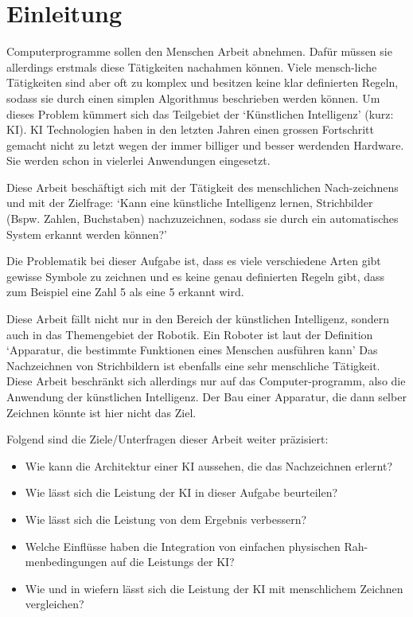 \chapter{Einleitung}
Computerprogramme sollen den Menschen Arbeit abnehmen. Dafür müssen sie
allerdings erstmals diese Tätigkeiten nachahmen können. Viele mensch\hyp{}liche
Tätigkeiten sind aber oft zu komplex und besitzen keine klar definierten Regeln,
sodass sie durch einen simplen Algorithmus beschrieben werden können. Um dieses
Problem kümmert sich das Teilgebiet der `Künstlichen Intelligenz' (kurz: KI). KI
Technologien haben in den letzten Jahren einen grossen Fortschritt gemacht nicht
zu letzt wegen der immer billiger und besser werdenden Hardware. Sie werden
schon in vielerlei Anwendungen eingesetzt.

Diese Arbeit beschäftigt sich mit der Tätigkeit des menschlichen Nach\hyp{}zeichnens
und mit der Zielfrage: `Kann eine künstliche Intelligenz lernen, Strichbilder
(Bspw. Zahlen, Buchstaben) nachzuzeichnen, sodass sie durch ein automatisches
System erkannt werden können?'

Die Problematik bei dieser Aufgabe ist,
dass es viele verschiedene Arten gibt gewisse Symbole zu zeichnen und es keine
genau definierten Regeln gibt, dass zum Beispiel eine Zahl 5 als eine 5 erkannt
wird.

Diese Arbeit fällt nicht nur in den Bereich der künstlichen Intelligenz, sondern
auch in das Themengebiet der Robotik. Ein Roboter ist laut der Definition
`Apparatur, die bestimmte Funktionen eines Menschen ausführen kann'
\cite{noauthor_duden_nodate-1} Das Nachzeichnen von Strichbildern ist ebenfalls
eine sehr menschliche Tätigkeit. Diese Arbeit beschränkt sich allerdings nur auf
das Computer\hyp{}programm, also die Anwendung der künstlichen Intelligenz. Der Bau
einer Apparatur, die dann selber Zeichnen könnte ist hier nicht das Ziel.

Folgend sind die Ziele/Unterfragen dieser Arbeit weiter präzisiert:
\begin{itemize}
    \item Wie kann die Architektur einer KI aussehen, die das Nachzeichnen
    erlernt?
    \item Wie lässt sich die Leistung der KI in dieser Aufgabe beurteilen?
    \item Wie lässt sich die Leistung von dem Ergebnis verbessern?
    \item Welche Einflüsse haben die Integration von einfachen physischen
    Rah\hyp{}menbedingungen auf die Leistungs der KI?
    \item Wie und in wiefern lässt sich die Leistung der KI mit menschlichem
    Zeichnen vergleichen?
\end{itemize}
